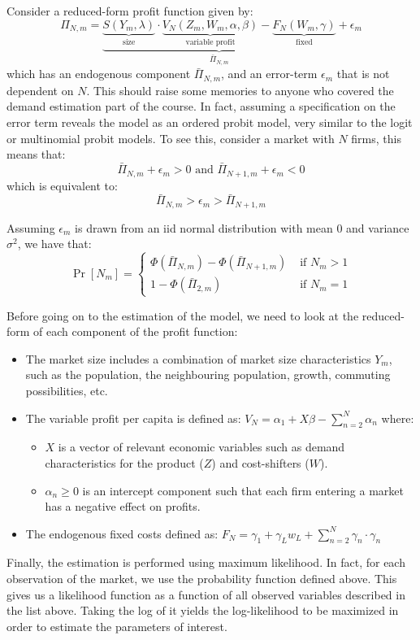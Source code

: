 \documentclass[12pt]{report}
\newcommand{\prob}[1]{\operatorname{Pr}\left[#1\right]}
\begin{document}
Consider a reduced-form profit function given by: $$\Pi_{N,m} = \underbrace{\underbrace{S(Y_m, \lambda)}_{\text{size}} \cdot \underbrace{V_{N}(Z_{m}, W_{m}, \alpha, \beta)}_{\text{variable profit}} - \underbrace{F_N(W_{m}, \gamma)}_{\text{fixed}}}_{\bar\Pi_{N,m}} + \epsilon_m $$ which has an endogenous component $\bar\Pi_{N,m}$, and an error-term $\epsilon_m$ that is not dependent on $N$. This should raise some memories to anyone who covered the demand estimation part of the course. In fact, assuming a specification on the error term reveals the model as an ordered probit model, very similar to the logit or multinomial probit models. To see this, consider a market with $N$ firms, this means that: $$ \bar\Pi_{N,m} + \epsilon_m > 0 \text{ and } \bar\Pi_{N+1,m} + \epsilon_m < 0 $$ which is equivalent to: $$ \bar\Pi_{N,m} > \epsilon_m > \bar\Pi_{N+1,m} $$

Assuming $\epsilon_m$ is drawn from an iid normal distribution with mean 0 and variance $\sigma^2$, we have that: $$\prob{N_m} = \begin{cases} \Phi(\bar\Pi_{N,m}) - \Phi(\bar\Pi_{N+1,m}) & \text{ if }N_m > 1 \\
1 - \Phi(\bar\Pi_{2,m}) & \text{ if }N_m = 1
\end{cases} $$

Before going on to the estimation of the model, we need to look at the reduced-form of each component of the profit function:\begin{itemize}
\item The market size includes a combination of market size characteristics $Y_m$, such as the population, the neighbouring population, growth, commuting possibilities, etc.
\item The variable profit per capita is defined as: $V_N = \alpha_1 + X\beta - \sum_{n=2}^{N} \alpha_n $ where:\begin{itemize}
\item $X$ is a vector of relevant economic variables such as demand characteristics for the product ($Z$) and cost-shifters ($W$).
\item $\alpha_n\geq 0$ is an intercept component such that each firm entering a market has a negative effect on profits. 
\end{itemize}
\item The endogenous fixed costs defined as: $F_N = \gamma_1 + \gamma_Lw_L + \sum_{n=2}^{N}\gamma_n\cdot\gamma_n $ 
\end{itemize}

Finally, the estimation is performed using maximum likelihood. In fact, for each observation of the market, we use the probability function defined above. This gives us a likelihood function as a function of all observed variables described in the list above. Taking the log of it yields the log-likelihood to be maximized in order to estimate the parameters of interest.
\end{document}
